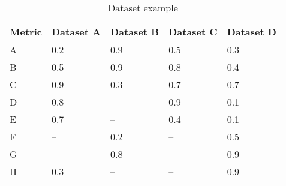 \begin{table}[tbph]
\center
    \begin{tabular}{|l|l|l|l|l|}
    \hline
    \textbf{Metric} & \textbf{Dataset A} & \textbf{Dataset B} & \textbf{Dataset C} & \textbf{Dataset D} \\   \hline
    A      & 0.2       & 0.9       & 0.5       & 0.3       \\  \hline
    B      & 0.5       & 0.9       & 0.8       & 0.4       \\  \hline
    C      & 0.9       & 0.3       & 0.7       & 0.7       \\  \hline
    D      & 0.8       & –         & 0.9       & 0.1       \\  \hline
    E      & 0.7       & –         & 0.4       & 0.1       \\  \hline
    F      & –         & 0.2       & –         & 0.5       \\  \hline
    G      & –         & 0.8       & –         & 0.9       \\  \hline
    H      & 0.3       & –         & –         & 0.9       \\  \hline
    \end{tabular}
    \label{tbl:datasets}
    \caption{Dataset example}
\end{table}

